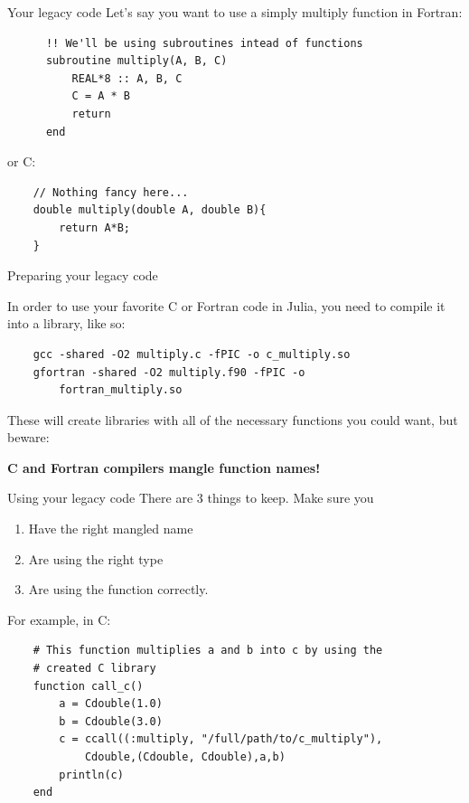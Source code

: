 \documentclass{beamer}
\begin{document}
\begin{frame}[fragile]{Your legacy code}
Let's say you want to use a simply multiply function in Fortran:
\begin{Verbatim}
      !! We'll be using subroutines intead of functions 
      subroutine multiply(A, B, C)
          REAL*8 :: A, B, C
          C = A * B
          return
      end
\end{Verbatim}
\vspace{0.5cm}
or C:
\begin{Verbatim}
    // Nothing fancy here...
    double multiply(double A, double B){
        return A*B;
    }
\end{Verbatim}
\end{frame}

\begin{frame}[fragile]{Preparing your legacy code}

In order to use your favorite C or Fortran code in Julia, you need to compile it into a library, like so:

\begin{Verbatim}
    gcc -shared -O2 multiply.c -fPIC -o c_multiply.so
    gfortran -shared -O2 multiply.f90 -fPIC -o 
        fortran_multiply.so
\end{Verbatim}

\pause
These will create libraries with all of the necessary functions you could want, but beware:

\begin{center}
\textbf{C and Fortran compilers mangle function names!}
\end{center}
\end{frame}

\begin{frame}[fragile]{Using your legacy code}
There are 3 things to keep. Make sure you 
\begin{enumerate}
\item Have the right mangled name
\item Are using the right type
\item Are using the function correctly.
\end{enumerate}
\pause

\vspace{0.5cm}
For example, in C:
\begin{Verbatim}
    # This function multiplies a and b into c by using the 
    # created C library
    function call_c()
        a = Cdouble(1.0)
        b = Cdouble(3.0)
        c = ccall((:multiply, "/full/path/to/c_multiply"),
            Cdouble,(Cdouble, Cdouble),a,b)
        println(c)
    end
\end{Verbatim}
\end{frame}
\end{document}
